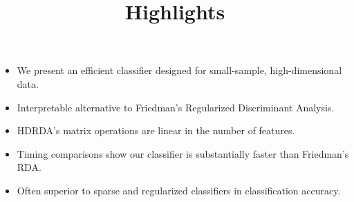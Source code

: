 \documentclass{elsarticle}
\begin{document}
\title{Highlights}

\maketitle

\begin{itemize}
  \item We present an efficient classifier designed for small-sample, high-dimensional data.
  \item Interpretable alternative to Friedman's Regularized Discriminant Analysis.
  \item HDRDA's matrix operations are linear in the number of features.
  \item Timing comparisons show our classifier is substantially faster than Friedman's RDA.
  \item Often superior to sparse and regularized classifiers in classification accuracy.
\end{itemize}
\end{document}
